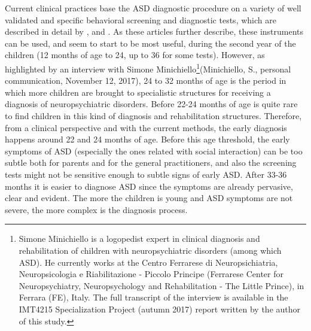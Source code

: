 Current clinical practices base the ASD diagnostic procedure on a variety of well validated and specific behavioral screening and diagnostic tests, which are described in detail by \cite{towie2016screening}, \cite{maganto2017screening} and \cite{charman2013measuerement}. As these articles further describe, these instruments can be used, and seem to start to be most useful, during the second year of the children (12 months of age to 24, up to 36 for some tests). However, as highlighted by an interview with Simone Minichiello\footnote{Simone Minichiello is a logopedist expert in clinical diagnosis and rehabilitation of children with neuropsychiatric disorders (among which ASD). He currently works at the Centro Ferrarese di Neuropsichiatria, Neuropsicologia e Riabilitazione - Piccolo Principe (Ferrarese Center for Neuropsychiatry, Neuropsychology and Rehabilitation - The Little Prince), in Ferrara (FE), Italy. The full transcript of the interview is available in the IMT4215 Specialization Project (autumn 2017) report written by the author of this study.}(Minichiello, S., personal communication, November 12, 2017), 24 to 32 months of age is the period in which more children are brought to specialistic structures for receiving a diagnosis of neuropsychiatric disorders. Before 22-24 months of age is quite rare to find children in this kind of diagnosis and rehabilitation structures. Therefore, from a clinical perspective and with the current methods, the early diagnosis happens around 22 and 24 months of age. Before this age threshold, the early symptoms of ASD (especially the ones related with social interaction) can be too subtle both for parents and for the general practitioners, and also the screening tests might not be sensitive enough to subtle signs of early ASD. After 33-36 months it is easier to diagnose ASD since the symptoms are already pervasive, clear and evident. The more the children is young and ASD symptoms are not severe, the more complex is the diagnosis process.

